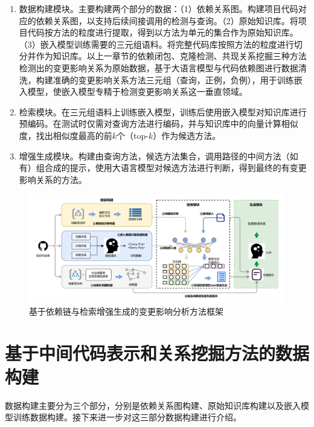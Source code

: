 \begin{enumerate}

    \item 数据构建模块。主要构建两个部分的数据：（1）依赖关系图。构建项目代码对应的依赖关系图，以支持后续间接调用的检测与查询。（2）原始知识库。将项目代码按方法的粒度进行提取，得到以方法为单元的集合作为原始知识库。（3）嵌入模型训练需要的三元组语料。将完整代码库按照方法的粒度进行切分并作为知识库。以上一章节的依赖闭包、克隆检测、共现关系挖掘三种方法检测出的变更影响关系为原始数据，基于大语言模型与代码依赖图进行数据清洗，构建准确的变更影响关系方法三元组（查询，正例，负例），用于训练嵌入模型，使嵌入模型专精于检测变更影响关系这一垂直领域。

    \item 检索模块。在三元组语料上训练嵌入模型，训练后使用嵌入模型对知识库进行预编码。在测试时仅需对查询方法进行编码，并与知识库中的向量计算相似度，找出相似度最高的前$k$个（top-$k$）作为候选方法。
    
    \item 增强生成模块。构建由查询方法，候选方法集合，调用路径的中间方法（如有）组合成的提示，使用大语言模型对候选方法进行判断，得到最终的有变更影响关系的方法。
    
\end{enumerate}

\begin{figure}[htbp]
\centering
\includegraphics[width = 1\textwidth]{figures/3_第三章框架.pdf}
\caption{基于依赖链与检索增强生成的变更影响分析方法框架}
\label{2_基于代码依赖与检索增强生成的变更影响分析方法框架}
\end{figure}


\section{基于中间代码表示和关系挖掘方法的数据构建}
\label{3_数据构建}

数据构建主要分为三个部分，分别是依赖关系图构建、原始知识库构建以及嵌入模型训练数据构建。接下来进一步对这三部分数据构建进行介绍。

